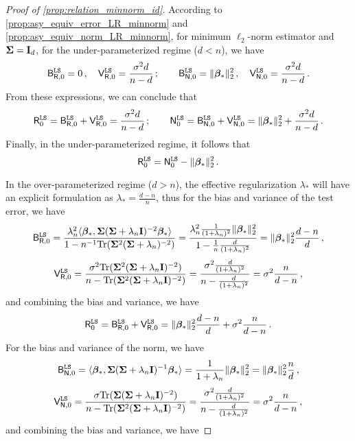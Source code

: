 \begin{proof}[Proof of \cref{prop:relation_minnorm_id}]
According to \cref{prop:asy_equiv_error_LR_minnorm} and \cref{prop:asy_equiv_norm_LR_minnorm}, for minimum $\ell_2$-norm estimator and ${\boldsymbol \Sigma} = {\mathbf I}_d$, for the under-parameterized regime ($d<n$), we have
\[
\begin{aligned}
\mathsf B_{\mathsf R,0}^{\tt LS} = 0\,, \quad \mathsf V_{\mathsf R,0}^{\tt LS} = \frac{\sigma^2d}{n-d}\,; \quad \quad \mathsf B_{\mathsf N,0}^{\tt LS} = \|{\boldsymbol \beta}_*\|_2^2\,, \quad \mathsf V_{\mathsf N,0}^{\tt LS} = \frac{\sigma^2d}{n-d}\,. 
\end{aligned}
\]
From these expressions, we can conclude that
\[
\begin{aligned}
    \mathsf R_{0}^{\tt LS} = \mathsf B_{\mathsf R,0}^{\tt LS} + \mathsf V_{\mathsf R,0}^{\tt LS} = \frac{\sigma^2d}{n-d}\,; \quad \quad \mathsf N_{0}^{\tt LS} = \mathsf B_{\mathsf N,0}^{\tt LS} + \mathsf V_{\mathsf N,0}^{\tt LS} = \|{\boldsymbol \beta}_*\|_2^2 + \frac{\sigma^2d}{n-d}\,. 
\end{aligned}
\]
Finally, in the under-parameterized regime, it follows that
\begin{equation*}
 \mathsf R_{0}^{\tt LS} = \mathsf N_{0}^{\tt LS} - \|{\boldsymbol \beta}_*\|_2^2\,.   
\end{equation*}

In the over-parameterized regime ($d>n$), the effective regularization $\lambda_*$ will have an explicit formulation as $\lambda_* = \frac{d-n}{n}$, thus for the bias and variance of the test error, we have
\[
\begin{aligned}
\mathsf B_{\mathsf R,0}^{\tt LS} = \frac{\lambda_n^2\langle{\boldsymbol \beta}_*,{\boldsymbol \Sigma}({\boldsymbol \Sigma}+\lambda_n{\mathbf I})^{-2}{\boldsymbol \beta}_*\rangle}{1-n^{-1}{\rm Tr}({\boldsymbol \Sigma}^2({\boldsymbol \Sigma}+\lambda_n)^{-2})} = \frac{\lambda_n^2 \frac{1}{(1 + \lambda_n)^2}\|{\boldsymbol \beta}_*\|_2^2}{1 - \frac{1}{n}\frac{d}{(1+\lambda_n)^2}} = \|{\boldsymbol \beta}_*\|_2^2\frac{d-n}{d}\,,
\end{aligned}
\]
\[
\begin{aligned}
\mathsf V_{\mathsf R,0}^{\tt LS} = \frac{\sigma^2{\rm Tr}({\boldsymbol \Sigma}^2({\boldsymbol \Sigma}+\lambda_n{\mathbf I})^{-2})}{n-{\rm Tr}({\boldsymbol \Sigma}^2({\boldsymbol \Sigma}+\lambda_n{\mathbf I})^{-2})} = \frac{\sigma^2\frac{d}{(1+\lambda_n)^2}}{n-\frac{d}{(1+\lambda_n)^2}} = \sigma^2\frac{n}{d-n}\,,
\end{aligned}
\]
and combining the bias and variance, we have
\begin{align}\label{eq:r_under}
\mathsf R_{0}^{\tt LS} = \mathsf B_{\mathsf R,0}^{\tt LS} + \mathsf V_{\mathsf R,0}^{\tt LS} = \|{\boldsymbol \beta}_*\|_2^2\frac{d-n}{d} + \sigma^2\frac{n}{d-n}\,.
\end{align}
For the bias and variance of the norm, we have
\[
\begin{aligned}
\mathsf B_{\mathsf N,0}^{\tt LS} = \langle{\boldsymbol \beta}_*,{\boldsymbol \Sigma}({\boldsymbol \Sigma}+\lambda_n{\mathbf I})^{-1}{\boldsymbol \beta}_*\rangle = \frac{1}{1+\lambda_n}\|{\boldsymbol \beta}_*\|_2^2 = \|{\boldsymbol \beta}_*\|_2^2\frac{n}{d}\,,
\end{aligned}
\]
\[
\begin{aligned}
\mathsf V_{\mathsf N,0}^{\tt LS} = \frac{\sigma{\rm Tr}({\boldsymbol \Sigma}({\boldsymbol \Sigma}+\lambda_n{\mathbf I})^{-2})}{n-{\rm Tr}({\boldsymbol \Sigma}^2({\boldsymbol \Sigma}+\lambda_n{\mathbf I})^{-2})} = \frac{\sigma^2\frac{d}{(1+\lambda_n)^2}}{n-\frac{d}{(1+\lambda_n)^2}} = \sigma^2\frac{n}{d-n}\,,
\end{aligned}
\]
and combining the bias and variance, we have


\end{proof}
